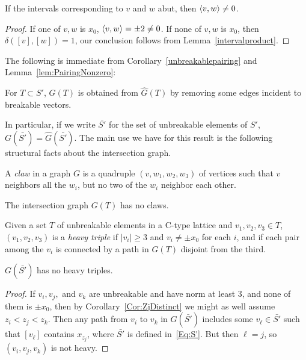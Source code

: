 \begin{lemma}\label{lem:PairingNonzero}
If the intervals corresponding to $v$ and $w$ abut, then $\left\langle v , w \right\rangle\ne0$.
\end{lemma}
\begin{proof}
If one of $v,w$ is $x_0$, $\left\langle v , w \right\rangle=\pm2\ne0$. If none of $v,w$ is $x_0$, then $\delta([v],[w])=1$, our conclusion follows from Lemma~\ref{intervalproduct}.
\end{proof}

The following is immediate from Corollary~\ref{unbreakablepairing} and Lemma~\ref{lem:PairingNonzero}:
\begin{prop}
For $T \subset S'$, $G(T)$ is obtained from $\hat{G}(T)$ by removing some edges incident to breakable vectors.
\end{prop}

In particular, if we write $\bar{S'}$ for the set of unbreakable elements of $S'$, ${G(\bar{S'}) = \hat{G}(\bar{S'})}$. The main use we have for this result is the following structural facts about the intersection graph. 

\begin{definition}
A {\it claw} in a graph $G$ is a quadruple $(v,w_1,w_2,w_3)$ of vertices such that $v$ neighbors all the $w_i$, but no two of the $w_i$ neighbor each other.
\end{definition}

\begin{lemma}\label{claw}
The intersection graph $G(T)$ has no claws.
\end{lemma}

\begin{definition}
Given a set $T$ of unbreakable elements in a C-type lattice and $v_1,v_2,v_3 \in T$, $(v_1,v_2,v_3)$ is a {\it heavy triple} if $|v_i| \ge 3$ and $v_i\ne\pm x_0$ for each $i$, and if each pair among the $v_i$ is connected by a path in $G(T)$ disjoint from the third. 
\end{definition}

\begin{lemma}\label{heavytriple}
$G(\bar{S'})$ has no heavy triples.
\end{lemma}
\begin{proof}
If $v_i,v_j,$ and $v_k$ are unbreakable and have norm at least $3$, and none of them is $\pm x_0$, then by Corollary~\ref{Cor:ZjDistinct} we might as well assume ${z_i} < {z_j} < {z_k}$. Then any path from $v_i$ to $v_k$ in $G(\bar{S'})$ includes some $v_\ell \in \bar{S'}$ such that $[v_\ell]$ contains $x_{z_j}$, where $\bar{S'}$ is defined in~\eqref{Eq:S'}. But then $\ell = j$, so $(v_i,v_j,v_k)$ is not heavy.
\end{proof}

